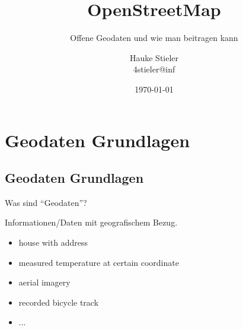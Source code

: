 \documentclass{beamer}
\title{OpenStreetMap}
\subtitle{Offene Geodaten und wie man beitragen kann}
\author{Hauke Stieler\\4stieler@inf}
\date{\today}
\begin{document}
	\maketitle
	
	\begin{frame}
		\tableofcontents
	\end{frame}
	
	\section{Geodaten Grundlagen}
	
		\subsection{Geodaten Grundlagen}
	
		\begin{frame}{Was sind \enquote{Geodaten}?}
			\begin{definition}
				Informationen/Daten mit geografischem Bezug.
			\end{definition}
			\begin{itemize}
				\item house with address\pause
				\item measured temperature at certain coordinate\pause
				\item aerial imagery\pause
				\item recorded bicycle track\pause
				\item ...
			\end{itemize}
		\end{frame}
		
\end{document}
